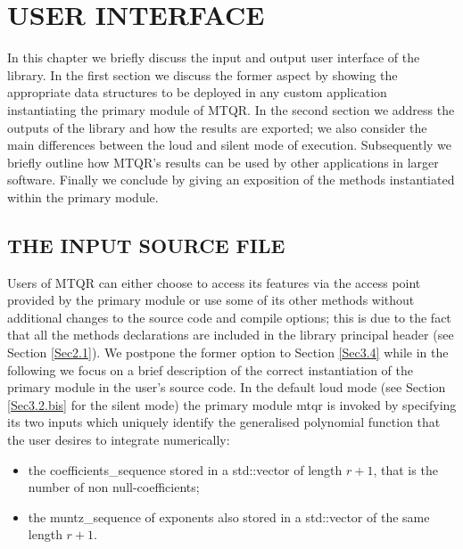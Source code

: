 \documentclass[a4paper, twosided]{book}
\begin{document}
\chapter[User interface]{\Huge \ttfamily USER INTERFACE}

In this chapter we briefly discuss the input and output user interface of the library. In the first section we discuss the former aspect by showing the appropriate data structures to be deployed in any custom application instantiating the primary module of MTQR. In the second section we address the outputs of the library and how the results are exported; we also consider the main differences between the loud and silent mode of execution. Subsequently we briefly outline how MTQR's results can be used by other applications in larger software. Finally we conclude by giving an exposition of the methods instantiated within the primary module.

\section[The input source file]{\changefont THE INPUT SOURCE FILE}\label{Sec3.1}

\noindent
 Users of MTQR can either choose to access its features via the access point provided by the primary module or use some of its other methods without additional changes to the source code and compile options; this is due to the fact that all the methods declarations are included in the library principal header (see Section \ref{Sec2.1}). We postpone the former option to Section \ref{Sec3.4} while in the following we focus on a brief description of the correct instantiation of the primary module in the user's source code. In the default loud mode (see Section \ref{Sec3.2.bis} for the silent mode) the primary module \colorbox{poliGrayBlue}{mtqr} is invoked by specifying its two inputs which uniquely identify the generalised polynomial function that the user desires to integrate numerically:

\begin{itemize}
    \item the \colorbox{poliGrayBlue}{coefficients\_sequence} stored in a \colorbox{poliGrayBlue}{std::vector} of length $r+1$, that is the number of non null-coefficients;
    \item the \colorbox{poliGrayBlue}{muntz\_sequence} of exponents also stored in a \colorbox{poliGrayBlue}{std::vector} of the same length $r+1$.
\end{itemize}
\end{document}
